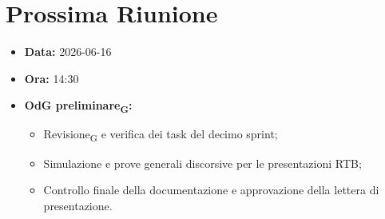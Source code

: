 \section{Prossima Riunione}
\begin{itemize}
    \item \textbf{Data:} 2026-06-16
    \item \textbf{Ora:} 14:30
    \item \textbf{OdG preliminare\textsubscript{G}:} 
    \begin{itemize}
        \item Revisione\textsubscript{G} e verifica dei task del decimo sprint;
        \item Simulazione e prove generali discorsive per le presentazioni RTB;
        \item Controllo finale della documentazione e approvazione della lettera di presentazione.
    \end{itemize}
\end{itemize}